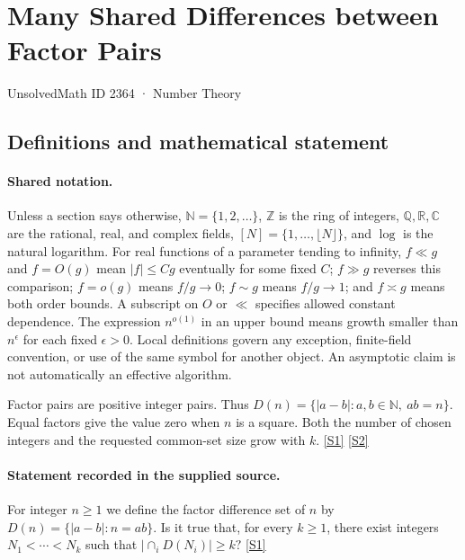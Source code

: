 \documentclass[11pt,a4paper]{article}
\newcommand{\N}{\mathbb{N}}
\newcommand{\Z}{\mathbb{Z}}
\newcommand{\Q}{\mathbb{Q}}
\newcommand{\R}{\mathbb{R}}
\newcommand{\C}{\mathbb{C}}
\newcommand{\sref}[2]{\hyperlink{source:#1:#2}{[S#2]}}
\begin{document}

\setcounter{section}{2363}

\section{Many Shared Differences between Factor Pairs}\label{2364}

{\small\sffamily UnsolvedMath ID 2364 · Number Theory}

\subsection{Definitions and mathematical statement}

\paragraph{Shared notation.}Unless a section says otherwise, $\N=\{1,2,\ldots\}$,
$\Z$ is the ring of integers, $\Q,\R,\C$ are the rational, real, and complex
fields, $[N]=\{1,\ldots,\lfloor N\rfloor\}$, and $\log$ is the natural
logarithm. For real functions of a parameter tending to infinity,
$f\ll g$ and $f=O(g)$ mean $|f|\leq Cg$ eventually for some fixed $C$;
$f\gg g$ reverses this comparison; $f=o(g)$ means $f/g\to0$;
$f\sim g$ means $f/g\to1$; and $f\asymp g$ means both order bounds.
A subscript on $O$ or $\ll$ specifies allowed constant dependence.
The expression $n^{o(1)}$ in an upper bound means growth smaller than
$n^\epsilon$ for each fixed $\epsilon>0$. Local definitions govern any
exception, finite-field convention, or use of the same symbol for another
object. An asymptotic claim is not automatically an effective algorithm.



Factor pairs are positive integer pairs. Thus $D(n)=\{|a-b|:a,b\in\N,\ ab=n\}$. Equal factors give the value zero when $n$ is a square. Both the number of chosen integers and the requested common-set size grow with $k$. \sref{2364}{1} \sref{2364}{2}

\paragraph{Statement recorded in the supplied source.}
For integer $n\geq 1$ we define the factor difference set of $n$ by $ D(n) = \{\lvert a-b\rvert : n=ab\}. $ Is it true that, for every $k\geq 1$, there exist integers $N_1<\cdots<N_k$ such that $ \lvert \cap_i D(N_i)\rvert \geq k? $ \sref{2364}{1}
\end{document}
